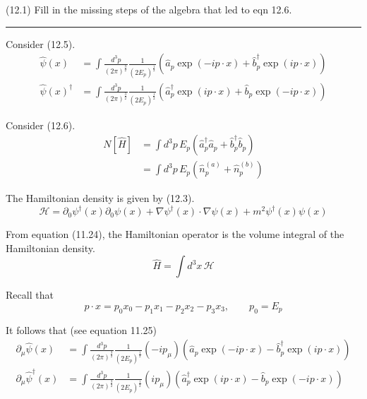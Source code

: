 \documentclass[12pt]{article}
\begin{document}
(12.1)
Fill in the missing steps of the algebra that led to
eqn 12.6.

\bigskip
\hrule

\bigskip
Consider (12.5).
\begin{equation*}
\begin{aligned}
\hat\psi(x)&=\int\frac{d^3p}{(2\pi)^\frac{3}{2}}\frac{1}{(2E_p)^\frac{1}{2}}
\left(\hat a_p\exp(-ip\cdot x)+\hat b_p^\dag\exp(ip\cdot x)\right)
\\
\hat\psi(x)^\dag&=\int\frac{d^3p}{(2\pi)^\frac{3}{2}}\frac{1}{(2E_p)^\frac{1}{2}}
\left(\hat a_p^\dag\exp(ip\cdot x)+\hat b_p\exp(-ip\cdot x)\right)
\end{aligned}
\tag{12.5}
\end{equation*}

Consider (12.6).
\begin{equation*}
\begin{aligned}
N[\hat H]&=\int d^3p\,E_p\left(\hat a_p^\dag\hat a_p+\hat b_p^\dag\hat b_p\right)
\\
&=\int d^3p\,E_p\left(\hat n_p^{(a)}+\hat n_p^{(b)}\right)
\end{aligned}
\tag{12.6}
\end{equation*}

The Hamiltonian density is given by (12.3).
\begin{equation*}
\mathcal H=\partial_0\psi^\dag(x)\partial_0\psi(x)+\nabla\psi^\dag(x)\cdot\nabla\psi(x)+m^2\psi^\dag(x)\psi(x)
\tag{12.3}
\end{equation*}

From equation (11.24), the Hamiltonian operator is the volume integral of the Hamiltonian density.
\begin{equation*}
\hat H=\int d^3x\,\mathcal H
\end{equation*}

Recall that
\begin{equation*}
p\cdot x=p_0x_0-p_1x_1-p_2x_2-p_3x_3,\qquad p_0=E_p
\end{equation*}

It follows that (see equation 11.25)
\begin{equation*}
\begin{aligned}
\partial_\mu\hat\psi(x)
&=\int\frac{d^3p}{(2\pi)^\frac{3}{2}}\frac{1}{(2E_p)^\frac{1}{2}}(-ip_\mu)
\left(\hat a_p\exp(-ip\cdot x)-\hat b_p^\dag\exp(ip\cdot x)\right)
\\
\partial_\mu\hat\psi^\dag(x)
&=\int\frac{d^3p}{(2\pi)^\frac{3}{2}}\frac{1}{(2E_p)^\frac{1}{2}}(ip_\mu)
\left(\hat a_p^\dag\exp(ip\cdot x)-\hat b_p\exp(-ip\cdot x)\right)
\end{aligned}
\end{equation*}
\end{document}
